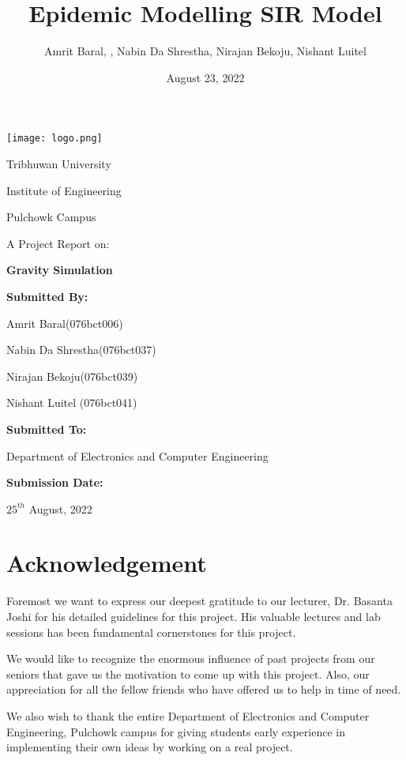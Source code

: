 \documentclass[12pt]{article}
\title{Epidemic Modelling SIR Model}
\author{Amrit Baral, , Nabin Da Shrestha, Nirajan Bekoju, Nishant Luitel}
\date{August 23, 2022}
\begin{document}
  

\bigskip
\bigskip
\bigskip
\bigskip

\begin{center}
\texttt{[image: logo.png]}

Tribhuwan University

Institute of Engineering

Pulchowk Campus

\bigskip
\bigskip
\bigskip
\bigskip

\noindent\makebox[\linewidth]
{\rule{15cm}{0.4pt}}
A Project Report on:

\textbf{\large Gravity Simulation}
\noindent\makebox[\linewidth]
{\rule{15cm}{0.4pt}}

\bigskip
\bigskip
\bigskip
\bigskip
\textbf{Submitted By:}

Amrit Baral(076bct006)

Nabin Da Shrestha(076bct037)

Nirajan Bekoju(076bct039)

Nishant Luitel (076bct041)

\bigskip
\bigskip
\bigskip
\bigskip
\textbf{Submitted To:}

Department of Electronics and Computer Engineering

\bigskip
\bigskip
\bigskip
\bigskip
\textbf{Submission Date:} 

$25^{th}$ August, 2022

\end{center}



\clearpage

\section{Acknowledgement}
Foremost we want to express our deepest gratitude to our lecturer, Dr. Basanta Joshi
for his detailed guidelines for this project. His valuable lectures and lab sessions has been
fundamental cornerstones for this project.

We would like to recognize the enormous influence of past projects from our seniors that gave us
the motivation to come up with this project. Also, our appreciation for all the fellow friends who
have offered us to help in time of need.

We also wish to thank the entire Department of Electronics and Computer Engineering, 
Pulchowk campus for giving students early experience in implementing their own ideas by
working on a real project.
\end{document}
